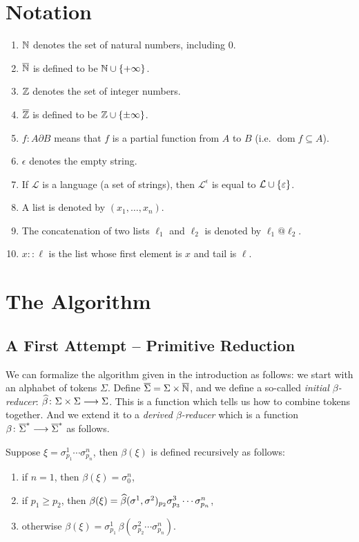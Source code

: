 \documentclass{llncs}
\newcounter{algo}
\begin{document}
\section{Notation}

\begin{enumerate}
    \item $\mathbb N$ denotes the set of natural numbers, including $0$.
    \item $\overline{\mathbb N}$ is defined to be $\bN\cup\set{+\infty}$.
    \item $\mathbb Z$ denotes the set of integer numbers.
    \item $\overline{\mathbb Z}$ is defined to be $\bZ\cup\set{\pm\infty}$.
    \item $f\colon A\partial B$ means that $f$ is a partial function from $A$ to $B$ (i.e. $\operatorname{dom}f\subseteq A$).
    \item $\epsilon$ denotes the empty string.
    \item If $\mathcal L$ is a language (a set of strings), then $\mathcal L^\epsilon$ is equal to $\mathcal L\cup\set\epsilon$.
    \item A list is denoted by $(x_1,\dots,x_n)$.
    \item The concatenation of two lists $\ell_1$ and $\ell_2$ is denoted by $\ell_1@\ell_2$.
    \item $x::\ell$ is the list whose first element is $x$ and tail is $\ell$.
\end{enumerate}

\section{The Algorithm}

\subsection{A First Attempt -- Primitive Reduction}

We can formalize the algorithm given in the introduction as follows: we start with an alphabet of tokens $\Sigma$.
Define $\overline\Sigma=\Sigma\times\overline{\mathbb N}$, and we define a so-called \textit{initial $\beta$-reducer}: $\widehat\beta\colon \Sigma\times\Sigma \longrightarrow \Sigma$.
This is a function which tells us how to combine tokens together.
And we extend it to a \textit{derived $\beta$-reducer} which is a function $\beta\colon\overline\Sigma^*\longrightarrow\overline\Sigma^*$ as follows.

Suppose $\xi=\sigma^1_{p_1}\cdots\sigma^n_{p_n}$, then $\beta(\xi)$ is defined recursively as follows:
\begin{enumerate}
    \item if $n=1$, then $\beta(\xi)=\sigma^n_0$,
    \item if $p_1\geq p_2$, then $\beta(\xi)=\widehat\beta(\sigma^1,\sigma^2)_{p_2}\sigma^3_{p_3}\cdots\sigma^n_{p_n}$,
    \item otherwise $\beta(\xi)=\sigma^1_{p_1}\,\beta(\sigma^2_{p_2}\cdots\sigma^n_{p_n})$.
\end{enumerate}
\end{document}
